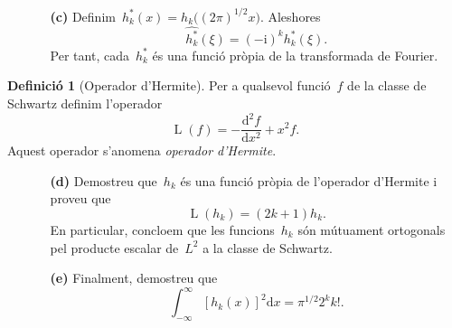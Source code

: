 \documentclass[a4paper]{article}
\theoremstyle{plain}
\theoremstyle{definition}
\newtheorem{definition}{Definició}
\DeclareMathOperator{\Lop}{L}
\newcommand{\iu}{\mathrm{i}}
\providecommand{\uppi}{\pi}
\newcommand{\diff}{\mathrm{d}}
\begin{document}
\begin{enumerate}
    \item[]\begin{enumerate}
        \item[\textbf{(c)}]
            Definim~\(h^{\ast}_{k}(x)=h_{k}\bigl((2\uppi)^{1/2}x\bigr)\).
            Aleshores
            \[
                \widehat{h^{\ast}_{k}}(\xi) = (-\iu)^{k}h_{k}^{\ast}(\xi).
            \]
            Per tant, cada~\(h^{\ast}_{k}\) és una funció pròpia de la
            transformada de Fourier.
    \end{enumerate}
\end{enumerate}

\begin{definition}[Operador d'Hermite]
    Per a qualsevol funció~\(f\) de la classe de Schwartz definim l'operador
    \[
        \Lop(f) = -\frac{\diff^{2} f}{\diff x^{2}} + x^{2}f.
    \]
    Aquest operador s'anomena \emph{operador d'Hermite}.
\end{definition}

\begin{enumerate}
    \item[]\begin{enumerate}
        \item[\textbf{(d)}] Demostreu que~\(h_{k}\) és una funció pròpia de
            l'operador d'Hermite i proveu que
            \[
                \Lop(h_{k}) = (2k+1)h_{k}.
            \]
            En particular, concloem que les funcions~\(h_{k}\) són mútuament
            ortogonals pel producte escalar de~\(L^{2}\) a la classe de
            Schwartz.
    \end{enumerate}
\end{enumerate}

\begin{enumerate}
    \item[]\begin{enumerate}
        \item[\textbf{(e)}] Finalment, demostreu que
            \[
                \int_{-\infty}^{\infty}
                [h_{k}(x)]^{2}\diff x
                =
                \uppi^{1/2}2^{k}k!.
            \]
    \end{enumerate}
\end{enumerate}
\end{document}
